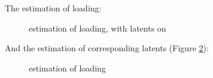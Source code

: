\documentclass[]{article}
\begin{document}
The estimation of loading:
\begin{figure}[h!]
	\caption{estimation of loading, with latents on}
	\label{loading and latent}
\end{figure}

And the estimation of corresponding latents (Figure \ref{loading and latents}):
\begin{figure}[h!]
	\caption{estimation of loading}
	\label{loading and latents}
\end{figure}
\end{document}
